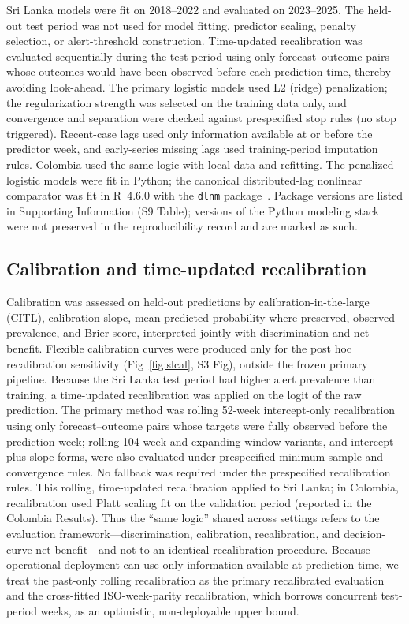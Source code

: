 \documentclass[11pt,a4paper]{article}
\begin{document}
Sri Lanka models were fit on 2018--2022 and evaluated on 2023--2025. The held-out test period was not used for model fitting, predictor scaling, penalty selection, or alert-threshold construction. Time-updated recalibration was evaluated sequentially during the test period using only forecast--outcome pairs whose outcomes would have been observed before each prediction time, thereby avoiding look-ahead. The primary logistic models used L2 (ridge) penalization; the regularization strength was selected on the training data only, and convergence and separation were checked against prespecified stop rules (no stop triggered). Recent-case lags used only information available at or before the predictor week, and early-series missing lags used training-period imputation rules. Colombia used the same logic with local data and refitting. The penalized logistic models were fit in Python; the canonical distributed-lag nonlinear comparator was fit in R~4.6.0 with the \texttt{dlnm} package~\cite{RCoreTeam2026,Gasparrini2011}. Package versions are listed in Supporting Information (S9 Table); versions of the Python modeling stack were not preserved in the reproducibility record and are marked as such.

\subsection{Calibration and time-updated recalibration}
Calibration was assessed on held-out predictions by calibration-in-the-large (CITL), calibration slope, mean predicted probability where preserved, observed prevalence, and Brier score, interpreted jointly with discrimination and net benefit. Flexible calibration curves were produced only for the post hoc recalibration sensitivity (Fig~\ref{fig:slcal}, S3 Fig), outside the frozen primary pipeline. Because the Sri Lanka test period had higher alert prevalence than training, a time-updated recalibration was applied on the logit of the raw prediction. The primary method was rolling 52-week intercept-only recalibration using only forecast--outcome pairs whose targets were fully observed before the prediction week; rolling 104-week and expanding-window variants, and intercept-plus-slope forms, were also evaluated under prespecified minimum-sample and convergence rules. No fallback was required under the prespecified recalibration rules. This rolling, time-updated recalibration applied to Sri Lanka; in Colombia, recalibration used Platt scaling fit on the validation period (reported in the Colombia Results). Thus the ``same logic'' shared across settings refers to the evaluation framework---discrimination, calibration, recalibration, and decision-curve net benefit---and not to an identical recalibration procedure. Because operational deployment can use only information available at prediction time, we treat the past-only rolling recalibration as the primary recalibrated evaluation and the cross-fitted ISO-week-parity recalibration, which borrows concurrent test-period weeks, as an optimistic, non-deployable upper bound.
\end{document}
